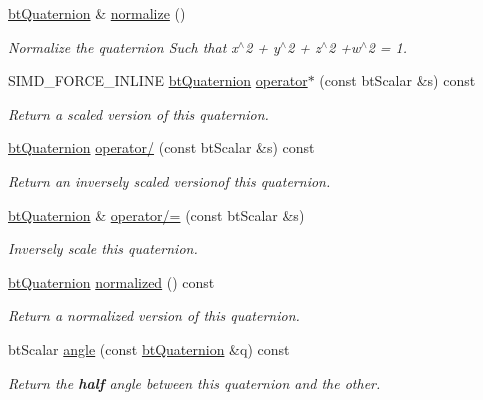 \begin{DoxyCompactItemize}
\hyperlink{classbtQuaternion}{bt\+Quaternion} \& \hyperlink{classbtQuaternion_adb5cd1eb8145a906f9f47857c498d3d6}{normalize} ()
\begin{DoxyCompactList}\small\item\em Normalize the quaternion Such that x$^\wedge$2 + y$^\wedge$2 + z$^\wedge$2 +w$^\wedge$2 = 1. \end{DoxyCompactList}\item 
S\+I\+M\+D\+\_\+\+F\+O\+R\+C\+E\+\_\+\+I\+N\+L\+I\+NE \hyperlink{classbtQuaternion}{bt\+Quaternion} \hyperlink{classbtQuaternion_a1a51cec25a155357f09641510886dbf9}{operator$\ast$} (const bt\+Scalar \&s) const
\begin{DoxyCompactList}\small\item\em Return a scaled version of this quaternion. \end{DoxyCompactList}\item 
\hyperlink{classbtQuaternion}{bt\+Quaternion} \hyperlink{classbtQuaternion_a02e9c919f808155f106be11ba4cee226}{operator/} (const bt\+Scalar \&s) const
\begin{DoxyCompactList}\small\item\em Return an inversely scaled versionof this quaternion. \end{DoxyCompactList}\item 
\hyperlink{classbtQuaternion}{bt\+Quaternion} \& \hyperlink{classbtQuaternion_a294fe99e7e5a8e0d45d111334e2e1552}{operator/=} (const bt\+Scalar \&s)
\begin{DoxyCompactList}\small\item\em Inversely scale this quaternion. \end{DoxyCompactList}\item 
\mbox{\label{classbtQuaternion_aa23ea377b98256ad7f2236a2a3a33a6e}} 
\hyperlink{classbtQuaternion}{bt\+Quaternion} \hyperlink{classbtQuaternion_aa23ea377b98256ad7f2236a2a3a33a6e}{normalized} () const
\begin{DoxyCompactList}\small\item\em Return a normalized version of this quaternion. \end{DoxyCompactList}\item 
bt\+Scalar \hyperlink{classbtQuaternion_a78254a50772f21074f09388a17d8b02b}{angle} (const \hyperlink{classbtQuaternion}{bt\+Quaternion} \&q) const
\begin{DoxyCompactList}\small\item\em Return the {\itshape {\bfseries half}} angle between this quaternion and the other. \end{DoxyCompactList}\item 

\end{DoxyCompactItemize}
